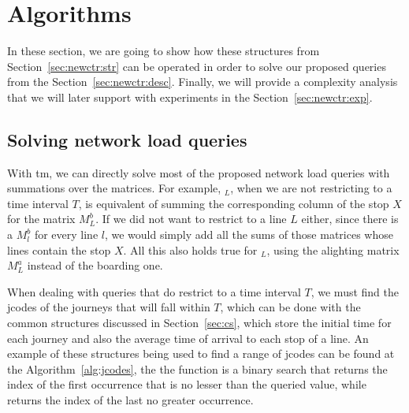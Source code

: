 \section{Algorithms}
\label{sec:newctr:algo}
	In these section, we are going to show how these structures from Section~\ref{sec:newctr:str}  can be operated in order to solve our proposed queries from the Section~\ref{sec:newctr:desc}. Finally, we will provide a complexity analysis that we will later support with experiments in the Section~\ref{sec:newctr:exp}.
	
	\subsection{Solving network load queries}
	With \gls{tm}, we can directly solve most of the proposed network load queries with summations over the matrices. For example, \boardX$_{L}$, when we are not restricting to a time interval $T$, is equivalent of summing the corresponding column of the stop $X$ for the matrix $M^b_L$. If we did not want to restrict to a line $L$ either, since there is a $M^b_l$ for every line $l$, we would simply add all the sums of those matrices whose lines contain the stop $X$. All this also holds true for \alightX$_{L}$, using the alighting matrix $M^a_L$ instead of the boarding one.
	
	When dealing with queries that do restrict to a time interval $T$, we must find the jcodes of the journeys that will fall within $T$, which can be done with the common structures discussed in Section~\ref{sec:cs}, which store the initial time for each journey and also the average time of arrival to each stop of a line. An example of these structures being used to find a range of jcodes can be found at the Algorithm~\ref{alg:jcodes}, the the function  is a binary search that returns the index of the first occurrence that is no lesser than the queried value, while  returns the index of the last no greater occurrence.
    
